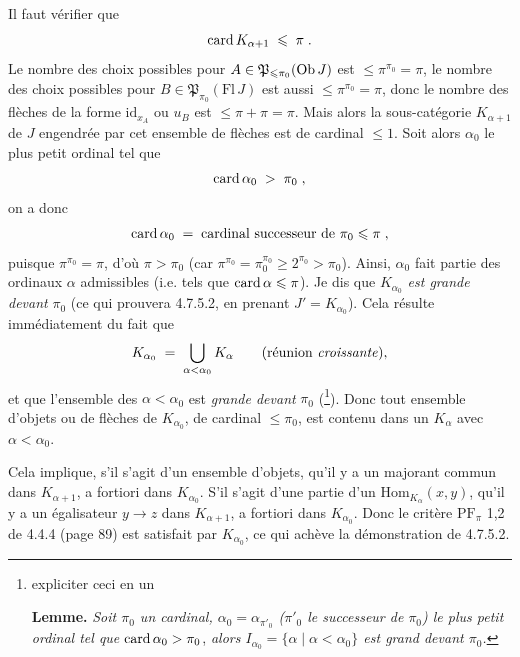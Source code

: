 Il faut vérifier que
\[
\operatorname{card} K_{\alpha+1} \;\leqslant\; \pi \;.
\]
Le nombre des choix possibles pour $A \in \mathfrak{P}_{\leqslant \pi_0}(\operatorname{Ob} J)$  est $\leqslant \pi^{\pi_0} = \pi$, le nombre des choix possibles pour $B \in \mathfrak{P}_{\pi_0}(\mathrm{Fl}\, J)$ est aussi $\leqslant \pi^{\pi_0} = \pi$, donc le nombre des flèches de la forme $\mathrm{id}_{x_A}$ ou $u_B$ est $\leqslant \pi + \pi = \pi$. Mais alors la sous-catégorie $K_{\alpha+1}$ de $J$ engendrée par cet ensemble de flèches est de cardinal $\leqslant 1$. Soit alors %
{}
$\alpha_0$ le plus petit ordinal tel que
\[
\operatorname{card} \alpha_0 \;>\; \pi_0 \;,
\]
on a donc
\[
\operatorname{card} \alpha_0 \;=\; \text{cardinal successeur de } \pi_0 \leqslant \pi \;,
\]
puisque $\pi^{\pi_0} = \pi$, d’où $\pi > \pi_0$ (car $\pi^{\pi_0} = \pi_0^{\pi_0} \geqslant 2^{\pi_0} > \pi_0$). Ainsi, $\alpha_0$ fait partie des ordinaux $\alpha$ admissibles (i.e. tels que $\operatorname{card} \alpha \leqslant \pi$). Je dis que $K_{\alpha_0}$ \textit{est grande devant} $\pi_0$ (ce qui prouvera 4.7.5.2, en prenant $J' = K_{\alpha_0}$). Cela résulte immédiatement du fait que
\[
K_{\alpha_0} \;=\; \bigcup_{\alpha < \alpha_0} K_{\alpha} \qquad (\text{réunion \textit{croissante}}),
\]
et que l’ensemble des $\alpha < \alpha_0$ est \textit{grande devant} $\pi_0$ (\footnote[71]{expliciter ceci en un

\textbf{Lemme.} \textit{Soit $\pi_0$ un cardinal, $\alpha_0 = \alpha_{\pi'_0}$ ($\pi'_0$ le successeur de $\pi_0$) le plus petit ordinal tel que} $\operatorname{card} \alpha_0 > \pi_0$, \textit{alors $I_{\alpha_0} = \{\alpha \mid \alpha < \alpha_0\}$ est grand devant $\pi_0$.}}). Donc tout ensemble d’objets ou de flèches de $K_{\alpha_0}$, de cardinal $\leqslant \pi_0$, est contenu dans un $K_{\alpha}$ avec $\alpha < \alpha_0$.

Cela implique, s’il s’agit d’un ensemble d’objets, qu’il y a un majorant commun dans $K_{\alpha+1}$, a fortiori dans $K_{\alpha_0}$. S’il s’agit d’une partie d’un $\mathrm{Hom}_{K_{\alpha}}(x,y)$, qu’il y a un égalisateur $y \longrightarrow z$ dans $K_{\alpha+1}$, a fortiori dans $K_{\alpha_0}$. Donc le critère $\mathrm{PF}_{\pi}$ 1,2 de 4.4.4 (page 89) est satisfait par $K_{\alpha_0}$, ce qui achève la démonstration de 4.7.5.2.

